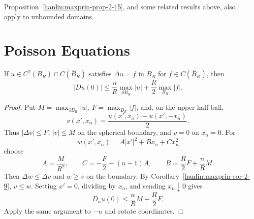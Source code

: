 \begin{remark}\label{hanlin:maxprin-remark-2-16}
Proposition~\ref{hanlin:maxprin-prop-2-15}, and some related results above, also
apply to unbounded domains.
\end{remark}

\section{Poisson Equations}\label{hanlin:maxprin-section-2-2}

\begin{lemma}\label{hanlin:poisson-lemma-2-17}
If $u\in C^2(B_R)\cap C(\overline B_R)$ satisfies $\Delta u=f$ in $B_R$ for
$f\in C(\overline B_R)$, then
\[
|Du(0)|\le \frac{n}{R}\max_{\partial B_R}|u|
 +\frac{R}{2}\max_{B_R}|f|.
\]
\end{lemma}
\begin{proof}
\sketch Put $M=\max_{\partial B_R}|u|$, $F=\max_{B_R}|f|$, and, on the upper
half-ball,
\[
v(x',x_n)=\frac{u(x',x_n)-u(x',-x_n)}2.
\]
Thus $|\Delta v|\le F$, $|v|\le M$ on the spherical boundary, and $v=0$ on
$x_n=0$. For
\[
w(x',x_n)=A|x'|^2+Bx_n+Cx_n^2
\]
choose
\[
A=\frac{M}{R^2},\qquad
C=-\frac F2-(n-1)A,\qquad
B=\frac R2F+\frac nR M.
\]
Then $\Delta w\le\Delta v$ and $w\ge v$ on the boundary. By
Corollary~\ref{hanlin:maxprin-cor-2-9}, $v\le w$. Setting $x'=0$, dividing by
$x_n$, and sending $x_n\downarrow0$ gives
\[
D_nu(0)\le\frac nR M+\frac R2F.
\]
Apply the same argument to $-u$ and rotate coordinates.
\end{proof}

